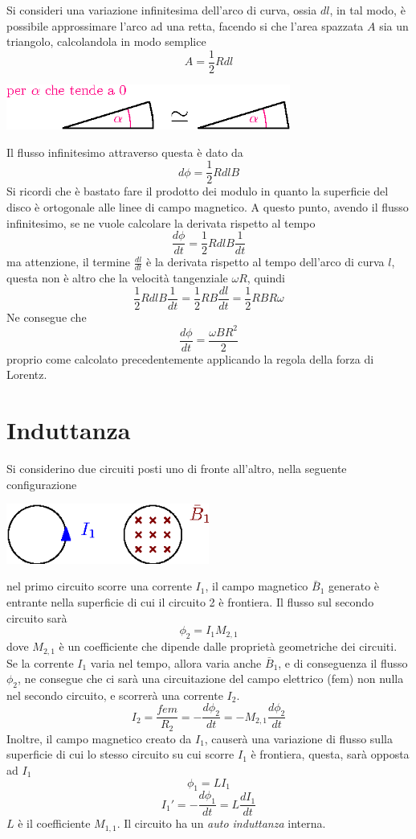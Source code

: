 \documentclass[10pt, letterpaper]{report}
\begin{document}
Si consideri una variazione infinitesima dell'arco di curva, ossia $dl$, in tal modo, è possibile approssimare l'arco ad una retta, facendo si che l'area spazzata $A$ sia un triangolo, calcolandola in modo semplice $$A=\frac{1}{2}R dl$$
\begin{center}
    \includegraphics[width=0.7\textwidth ]{images/alphaA0.eps}
\end{center}
Il flusso infinitesimo attraverso questa è dato da 
$$ d\phi = \frac{1}{2}R dl B$$
Si ricordi che è bastato fare il prodotto dei modulo in quanto la superficie del disco è ortogonale alle linee di campo magnetico. A questo punto, avendo il flusso infinitesimo, se ne vuole calcolare la derivata rispetto al tempo 
$$ \frac{d\phi}{dt}=\frac{1}{2}R dl B\frac{1}{dt}$$
ma attenzione, il termine $\frac{dl}{dt}$ è la derivata rispetto al tempo dell'arco di curva $l$, questa non è altro che la velocità tangenziale $\omega R$, quindi 
$$  \frac{1}{2}R dl B\frac{1}{dt}= \frac{1}{2}RB\frac{dl}{dt}=\frac{1}{2}RBR\omega$$
Ne consegue che 
$$\frac{d\phi}{dt}=\frac{\omega B R^2}{2} $$
proprio come calcolato precedentemente applicando la regola della forza di Lorentz.
\flowerLine  
\section{Induttanza}
Si considerino due circuiti posti uno di fronte all'altro, nella 
seguente configurazione\begin{center}
    \includegraphics[width=0.5\textwidth ]{images/induttanza.eps}
\end{center}
nel primo circuito scorre una corrente $I_1$, il campo 
magnetico $\bar B_1$ generato è entrante nella superficie 
di cui il circuito 2 è frontiera. Il flusso sul secondo 
circuito sarà $$ \phi_2=I_1M_{2,1}$$
dove $M_{2,1}$ è un coefficiente che dipende dalle proprietà 
geometriche dei circuiti. Se la corrente $I_1$ varia nel 
tempo, allora varia anche $\bar B_1$, e di conseguenza 
il flusso $\phi_2$, ne consegue che ci sarà una 
circuitazione del campo elettrico (fem) non nulla nel 
secondo circuito, e scorrerà una corrente $I_2$. 
$$ I_2=\frac{fem}{R_2}=-\frac{d\phi_2}{dt}=-M_{2,1}\frac{d\phi_2}{dt}$$
Inoltre, il campo magnetico creato da $I_1$, causerà una 
variazione di flusso sulla superficie di cui lo stesso circuito 
su cui scorre $I_1$ è frontiera, questa, sarà opposta ad 
$I_1$ 
$$\phi_1=LI_1 $$
$$ I_1'=-\frac{d\phi_1}{dt}=L\frac{dI_1}{dt}$$
$L$ è il coefficiente $M_{1,1}$. Il circuito ha un 
\textit{auto induttanza} interna.
\end{document}
